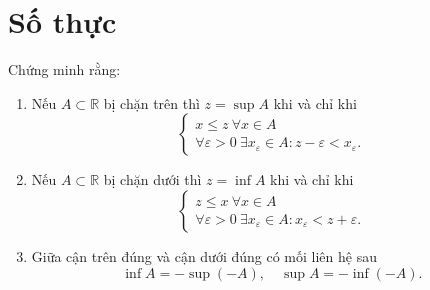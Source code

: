 \documentclass[class=analysis,crop=false]{standalone}
\begin{document}
\setcounter{exercise}{0}

\chapter{Số thực}

\begin{exercise}\label{chapter1:sup-and-inf}
    Chứng minh rằng:
    \begin{enumerate}[label = (\roman*)]
        \item Nếu $A\subset\mathbb{R}$ bị chặn trên thì $z = \sup A$ khi và chỉ khi
            \[
                \begin{cases}
                    x\le z\ \forall x\in A \\
                    \forall\varepsilon > 0\ \exists x_{\varepsilon}\in A : z - \varepsilon < x_{\varepsilon}.
                \end{cases}
            \]
        \item Nếu $A\subset\mathbb{R}$ bị chặn dưới thì $z = \inf A$ khi và chỉ khi
            \[
                \begin{cases}
                    z\le x\ \forall x\in A \\
                    \forall\varepsilon > 0\ \exists x_{\varepsilon}\in A : x_{\varepsilon} < z + \varepsilon.
                \end{cases}
            \]
        \item Giữa cận trên đúng và cận dưới đúng có mối liên hệ sau
            \[
                \inf A = -\sup(-A),\quad \sup A = -\inf(-A).
            \]
    \end{enumerate}
\end{exercise}
\end{document}
